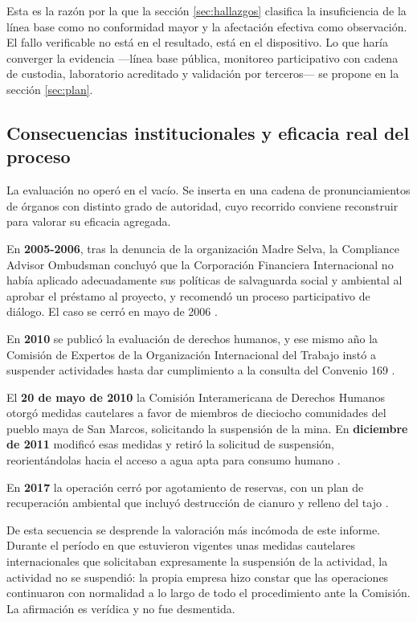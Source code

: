 Esta es la razón por la que la sección \ref{sec:hallazgos} clasifica la
insuficiencia de la línea base como no conformidad mayor y la afectación efectiva
como observación. El fallo verificable no está en el resultado, está en el
dispositivo. Lo que haría converger la evidencia —línea base pública, monitoreo
participativo con cadena de custodia, laboratorio acreditado y validación por
terceros— se propone en la sección \ref{sec:plan}.

\subsection{Consecuencias institucionales y eficacia real del proceso}

La evaluación no operó en el vacío. Se inserta en una cadena de pronunciamientos
de órganos con distinto grado de autoridad, cuyo recorrido conviene reconstruir
para valorar su eficacia agregada.

En \textbf{2005-2006}, tras la denuncia de la organización Madre Selva, la
Compliance Advisor Ombudsman concluyó que la Corporación Financiera Internacional
no había aplicado adecuadamente sus políticas de salvaguarda social y ambiental al
aprobar el préstamo al proyecto, y recomendó un proceso participativo de diálogo.
El caso se cerró en mayo de 2006 \parencite{cao2006marlin}.

En \textbf{2010} se publicó la evaluación de derechos humanos, y ese mismo año la
Comisión de Expertos de la Organización Internacional del Trabajo instó a
suspender actividades hasta dar cumplimiento a la consulta del Convenio 169
\parencite{oit1989convenio169}.

El \textbf{20 de mayo de 2010} la Comisión Interamericana de Derechos Humanos
otorgó medidas cautelares a favor de miembros de dieciocho comunidades del pueblo
maya de San Marcos, solicitando la suspensión de la mina. En
\textbf{diciembre de 2011} modificó esas medidas y retiró la solicitud de
suspensión, reorientándolas hacia el acceso a agua apta para consumo humano
\parencite{cidh2010medidas}.

En \textbf{2017} la operación cerró por agotamiento de reservas, con un plan de
recuperación ambiental que incluyó destrucción de cianuro y relleno del tajo
\parencite{goldcorp2023marlin}.

De esta secuencia se desprende la valoración más incómoda de este informe. Durante
el período en que estuvieron vigentes unas medidas cautelares internacionales que
solicitaban expresamente la suspensión de la actividad, la actividad no se
suspendió: la propia empresa hizo constar que las operaciones continuaron con
normalidad a lo largo de todo el procedimiento ante la Comisión. La afirmación es
verídica y no fue desmentida.

